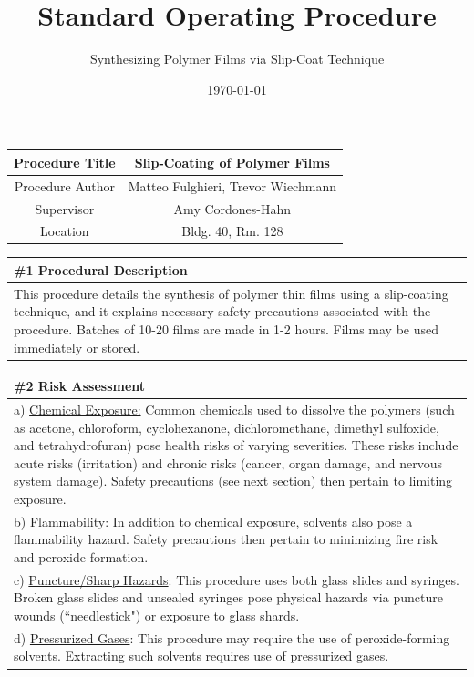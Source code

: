 \documentclass{article}
\begin{document}
\title{Standard Operating Procedure}
\date{\today}
\author{Synthesizing Polymer Films via Slip-Coat Technique}

\maketitle

\begin{center}
\begin{tabular}{ |c|c| }
\hline
\cellcolor{gray!25} Procedure Title & Slip-Coating of Polymer Films \\
\hline
\cellcolor{gray!25} Procedure Author & Matteo Fulghieri, Trevor Wiechmann \\
\hline
\cellcolor{gray!25} Supervisor & Amy Cordones-Hahn \\
\hline
\cellcolor{gray!25} Location & Bldg. 40, Rm. 128 \\
\hline
\end{tabular}
\end{center}

\begin{center}
\begin{tabular}{ |p{\textwidth}| }
\hline
\cellcolor{gray!25} \#1 \textbf{Procedural Description} \\
\hline
This procedure details the synthesis of polymer thin films using a slip-coating technique, and it explains necessary safety precautions associated with the procedure. Batches of 10-20 films are made in 1-2 hours. Films may be used immediately or stored. \\  
\hline
\end{tabular}
\end{center}

\begin{center}
\begin{tabular}{ |p{\textwidth}| }
\hline
\cellcolor{gray!25} \#2 \textbf{Risk Assessment} \\
\hline
a) \underline{Chemical Exposure:} Common chemicals used to dissolve the polymers (such as acetone, chloroform, cyclohexanone, dichloromethane, dimethyl sulfoxide, and tetrahydrofuran) pose health risks of varying severities. These risks include acute risks (irritation) and chronic risks (cancer, organ damage, and nervous system damage). Safety precautions (see next section) then pertain to limiting exposure. \\
b) \underline{Flammability}: In addition to chemical exposure, solvents also pose a flammability hazard. Safety precautions then pertain to minimizing fire risk and peroxide formation. \\
c) \underline{Puncture/Sharp Hazards}: This procedure uses both glass slides and syringes. Broken glass slides and unsealed syringes pose physical hazards via puncture wounds (``needlestick") or exposure to glass shards. \\ 
d) \underline{Pressurized Gases}: This procedure may require the use of peroxide-forming solvents. Extracting such solvents requires use of pressurized gases. \\
\hline
\end{tabular}
\end{center}
\end{document}
